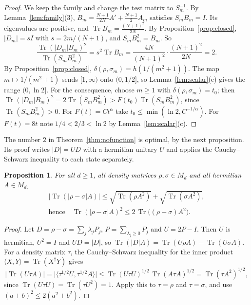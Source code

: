 \documentclass[11pt]{amsart}
\newtheorem{proposition}[theorem]{Proposition}
\theoremstyle{definition}\newtheorem{definition}[theorem]{Definition}
\theoremstyle{remark}\newtheorem{remark}[theorem]{Remark}
\DeclareMathOperator{\Tr}{Tr}
\newcommand{\abs}[1]{\lvert #1\rvert}
\begin{document}
\begin{proof}
We keep the family and change the test matrix to \(S_m^{-1}\). By Lemma~\ref{lem:family}(3), \(B_m=\frac{N+1}{2N}A'+\frac{N+1}{2}A_m\) satisfies \(S_mB_m=I\). Its eigenvalues are positive, and \(\Tr B_m=\frac{(N+1)^2}{2N}\). By Proposition~\ref{prop:closed}, \(\abs{D_m}=sI\) with \(s=2m/(N+1)\), and \(S_mB_m^2=B_m\). So
\[
\frac{\Tr(\abs{D_m}B_m)^2}{\Tr(S_mB_m^2)}=s^2\Tr B_m=\frac{4N}{(N+1)^2}\cdot\frac{(N+1)^2}{2N}=2 .
\]
By Proposition~\ref{prop:closed}, \(\delta(\rho,\sigma_m)=h(1/(m^2+1))\). The map \(m\mapsto1/(m^2+1)\) sends \([1,\infty)\) onto \((0,1/2]\), so Lemma~\ref{lem:scalar}(e) gives the range \((0,\ln2]\). For the consequence, choose \(m\ge1\) with \(\delta(\rho,\sigma_m)=t_0\); then \(\Tr(\abs{D_m}B_m)^2=2\Tr(S_mB_m^2)>F(t_0)\Tr(S_mB_m^2)\), since \(\Tr(S_mB_m^2)>0\). For \(F(t)=Ct^\alpha\) take \(t_0\le\min(\ln2,C^{-1/\alpha})\). For \(F(t)=8t\) note \(1/4<2/3<\ln2\) by Lemma~\ref{lem:scalar}(c).
\end{proof}

The number \(2\) in Theorem~\ref{thm:nofunction} is optimal, by the next proposition. Its proof writes \(\abs{D}=UD\) with a hermitian unitary \(U\) and applies the Cauchy--Schwarz inequality to each state separately.

\begin{proposition}\label{prop:two}
For all \(d\ge1\), all density matrices \(\rho,\sigma\in M_d\) and all hermitian \(A\in M_d\),
\begin{gather*}
\bigl\lvert\Tr(\abs{\rho-\sigma}A)\bigr\rvert\le\sqrt{\Tr(\rho A^2)}+\sqrt{\Tr(\sigma A^2)},\\
\text{hence}\quad \Tr(\abs{\rho-\sigma}A)^2\le2\,\Tr\bigl((\rho+\sigma)A^2\bigr).
\end{gather*}
\end{proposition}

\begin{proof}
Let \(D=\rho-\sigma=\sum_j\lambda_jP_j\), \(P=\sum_{\lambda_j\ge0}P_j\) and \(U=2P-I\). Then \(U\) is hermitian, \(U^2=I\) and \(UD=\abs{D}\), so \(\Tr(\abs{D}A)=\Tr(U\rho A)-\Tr(U\sigma A)\). For a density matrix \(\tau\), the Cauchy--Schwarz inequality for the inner product \(\langle X,Y\rangle=\Tr(X^\dagger Y)\) gives
\[
\abs{\Tr(U\tau A)}=\abs{\langle\tau^{1/2}U,\tau^{1/2}A\rangle}\le\Tr(U\tau U)^{1/2}\,\Tr(A\tau A)^{1/2}=\Tr(\tau A^2)^{1/2},
\]
since \(\Tr(U\tau U)=\Tr(\tau U^2)=1\). Apply this to \(\tau=\rho\) and \(\tau=\sigma\), and use \((a+b)^2\le2(a^2+b^2)\).
\end{proof}
\end{document}
